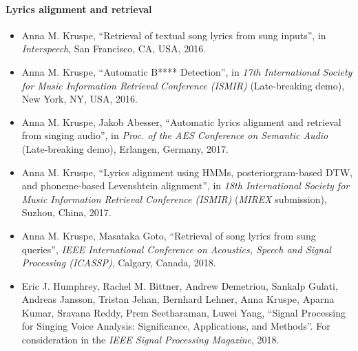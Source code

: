 \paragraph{Lyrics alignment and retrieval}
\begin{itemize}
\item Anna M. Kruspe, ``Retrieval of textual song lyrics from sung inputs'', in \textit{Interspeech}, San Francisco, CA, USA, 2016.
\item Anna M. Kruspe, ``Automatic B**** Detection'', in \textit{17th International Society for Music Information Retrieval Conference (ISMIR)} (Late-breaking demo), New York, NY, USA, 2016.
\item Anna M. Kruspe, Jakob Abesser, ``Automatic lyrics alignment and retrieval from singing audio'', in \textit{Proc. of the AES Conference on Semantic Audio} (Late-breaking demo), Erlangen, Germany, 2017.
\item Anna M. Kruspe, ``Lyrics alignment using HMMs, posteriorgram-based DTW, and phoneme-based Levenshtein alignment'', in \textit{18th International Society for Music Information Retrieval Conference (ISMIR)} (\textit{MIREX} submission), Suzhou, China, 2017.
\item Anna M. Kruspe, Masataka Goto, ``Retrieval of song lyrics from sung queries'', \textit{IEEE International Conference on Acoustics, Speech and Signal Processing (ICASSP)}, Calgary, Canada, 2018.
\item Eric J. Humphrey, Rachel M. Bittner, Andrew Demetriou, Sankalp Gulati, Andreas Jansson, Tristan Jehan, Bernhard Lehner, Anna Kruspe, Aparna Kumar, Sravana Reddy, Prem Seetharaman, Luwei Yang, ``Signal Processing for Singing Voice Analysis: Significance, Applications, and Methods''. For consideration in the \textit{IEEE Signal Processing Magazine}, 2018.
\end{itemize}


